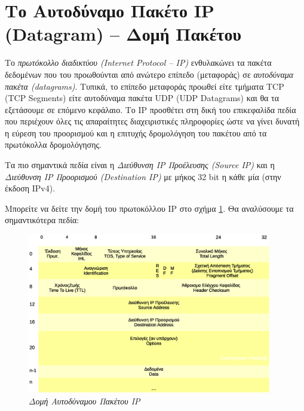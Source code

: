 %
%
\section{Το Αυτοδύναμο Πακέτο IP (Datagram) -- Δομή Πακέτου}

Το \emph{πρωτόκολλο διαδικτύου (Internet Protocol -- IP)} ενθυλακώνει τα πακέτα δεδομένων που του προωθούνται από ανώτερο επίπεδο (μεταφοράς) σε \emph{αυτοδύναμα πακέτα (datagrams)}. Τυπικά, το επίπεδο μεταφοράς προωθεί είτε τμήματα TCP (TCP Segments) είτε αυτοδύναμα πακέτα UDP (UDP Datagrams) και θα τα εξετάσουμε σε επόμενο κεφάλαιο. Το IP προσθέτει στη δική του επικεφαλίδα πεδία που περιέχουν όλες τις απαραίτητες διαχειριστικές πληροφορίες ώστε να γίνει δυνατή η εύρεση του προορισμού και η επιτυχής δρομολόγηση του πακέτου από τα πρωτόκολλα δρομολόγησης.

Τα πιο σημαντικά πεδία είναι η \emph{Διεύθυνση IP Προέλευσης (Source IP)} και η \emph{Διεύθυνση IP Προορισμού (Destination IP)} με μήκος 32 bit η κάθε μία (στην έκδοση IPv4).

Μπορείτε να δείτε την δομή του πρωτοκόλλου IP στο σχήμα \ref{3-5}. Θα αναλύσουμε τα σημαντικότερα πεδία:

\begin{figure}[!ht]
  \centering
  \includegraphics[width=0.95\textwidth]{images/chapter3/3-5}
  \caption {\textsl{Δομή Αυτοδύναμου Πακέτου IP}}
  \label{3-5}
\end{figure}

